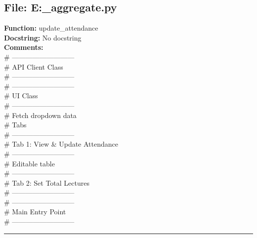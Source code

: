 {\subsection*{File: E:\project\capstone\frontend\faculty\attendance_aggregate.py}
\textbf{Function:} update_attendance\\
\textbf{Docstring:} No docstring\\
\textbf{Comments:}\\
# ---------------------------\\
# API Client Class\\
# ---------------------------\\
# ---------------------------\\
# UI Class\\
# ---------------------------\\
# Fetch dropdown data\\
# Tabs\\
# ---------------------------\\
# Tab 1: View & Update Attendance\\
# ---------------------------\\
# Editable table\\
# ---------------------------\\
# Tab 2: Set Total Lectures\\
# ---------------------------\\
# ---------------------------\\
# Main Entry Point\\
# ---------------------------\\

\hrule

}

